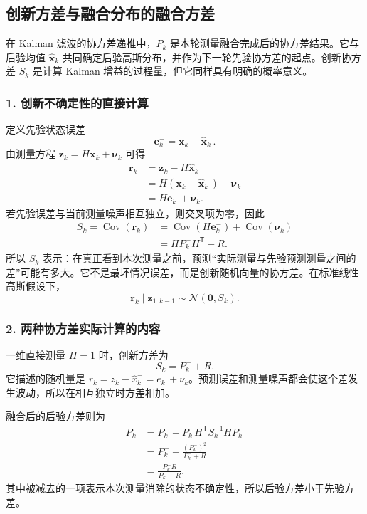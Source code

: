 \documentclass[UTF8,a4paper,11pt]{ctexart}
\newcommand{\prior}{^{-}}
\newcommand{\transpose}{^{\mathsf T}}
\begin{document}
\subsection{创新方差与融合分布的融合方差}

在 Kalman 滤波的协方差递推中，$P_k$ 是本轮测量融合完成后的协方差结果。它与后验均值 $\hat{\bm x}_k$ 共同确定后验高斯分布，并作为下一轮先验协方差的起点。创新协方差 $S_k$ 是计算 Kalman 增益的过程量，但它同样具有明确的概率意义。

\subsubsection*{1. 创新不确定性的直接计算}

定义先验状态误差
\begin{equation}
\bm e_k\prior=\bm x_k-\hat{\bm x}_k\prior.
\end{equation}
由测量方程 $\bm z_k=H\bm x_k+\bm\nu_k$ 可得
\begin{align}
\bm r_k
&=\bm z_k-H\hat{\bm x}_k\prior\\
&=H(\bm x_k-\hat{\bm x}_k\prior)+\bm\nu_k\\
&=H\bm e_k\prior+\bm\nu_k.
\end{align}
若先验误差与当前测量噪声相互独立，则交叉项为零，因此
\begin{align}
S_k
=\operatorname{Cov}(\bm r_k)
&=\operatorname{Cov}(H\bm e_k\prior)+\operatorname{Cov}(\bm\nu_k)\\
&=HP_k\prior H\transpose+R.
\end{align}
所以 $S_k$ 表示：在真正看到本次测量之前，预测“实际测量与先验预测测量之间的差”可能有多大。它不是最坏情况误差，而是创新随机向量的协方差。在标准线性高斯假设下，
\begin{equation}
\bm r_k\mid\bm z_{1:k-1}\sim\mathcal N(\bm0,S_k).
\end{equation}

\subsubsection*{2. 两种协方差实际计算的内容}

一维直接测量 $H=1$ 时，创新方差为
\begin{equation}
\boxed{S_k=P_k\prior+R}.
\end{equation}
它描述的随机量是 $r_k=z_k-\hat x_k\prior=e_k\prior+\nu_k$。预测误差和测量噪声都会使这个差发生波动，所以在相互独立时方差相加。

融合后的后验方差则为
\begin{align}
P_k
&=P_k\prior-P_k\prior H\transpose S_k^{-1}HP_k\prior\\
&=P_k\prior-\frac{(P_k\prior)^2}{P_k\prior+R}\\
&=\frac{P_k\prior R}{P_k\prior+R}.
\end{align}
其中被减去的一项表示本次测量消除的状态不确定性，所以后验方差小于先验方差。
\end{document}
